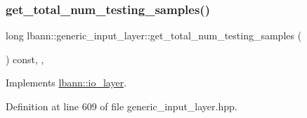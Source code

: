 \subsubsection{\texorpdfstring{get\+\_\+total\+\_\+num\+\_\+testing\+\_\+samples()}{get\_total\_num\_testing\_samples()}}
{\footnotesize\ttfamily long lbann\+::generic\+\_\+input\+\_\+layer\+::get\+\_\+total\+\_\+num\+\_\+testing\+\_\+samples (\begin{DoxyParamCaption}{ }\end{DoxyParamCaption}) const\hspace{0.3cm}{\ttfamily [inline]}, {\ttfamily [override]}, {\ttfamily [virtual]}}



Implements \hyperlink{classlbann_1_1io__layer_a8c1575ad108ffbdf2a553a44509211e6}{lbann\+::io\+\_\+layer}.



Definition at line 609 of file generic\+\_\+input\+\_\+layer.\+hpp.



